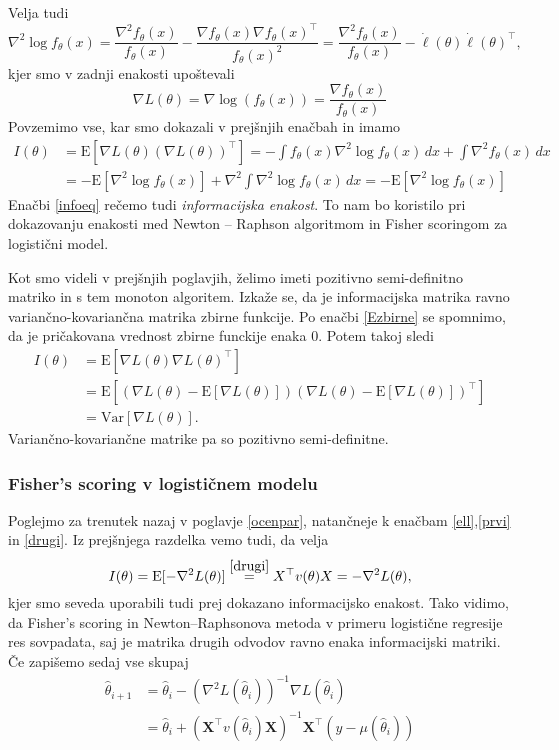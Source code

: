 \documentclass[12pt,a4paper]{amsart}
\theoremstyle{definition} %
\theoremstyle{plain} %
\begin{document}
Velja tudi
\[
    \nabla^{2} \log{f_{\theta}(x)} = \frac{\nabla^2 f_{\theta}(x)}{f_{\theta}(x)} - \frac{\nabla f_{\theta}(x) \nabla f_{\theta}(x)^\top }{f_{\theta}(x)^{2}} = 
    \frac{\nabla^2 f_{\theta}(x)}{f_{\theta}(x)} - \dot{\ell}(\theta)\dot{\ell}(\theta)^\top,
\]
kjer smo v zadnji enakosti upoštevali
\[
    \nabla L (\theta) = \nabla \log(f_{\theta}(x)) = \frac{\nabla f_{\theta}(x)}{f_{\theta}(x)} 
\]
Povzemimo vse, kar smo dokazali v prejšnjih enačbah in imamo
\begin{align}\label{infoeq}
    I(\theta) &= \mathrm{E}[\nabla L(\theta)(\nabla L(\theta))^\top] =  -\int f_{\theta}(x) \nabla^2 \log f_{\theta}(x) \,dx+ \int \nabla^2 f_{\theta}(x) \,dx \nonumber \\
    &= -\mathrm{E}[\nabla^2 \log f_{\theta}(x)] + \nabla^2\int \nabla^2 \log f_{\theta}(x) \,dx = -\mathrm{E}[\nabla^2 \log f_{\theta}(x)]
\end{align}
Enačbi \eqref{infoeq} rečemo tudi \textit{informacijska enakost}. To nam bo koristilo pri dokazovanju enakosti med Newton -- Raphson algoritmom in Fisher scoringom za logistični model.

Kot smo videli v prejšnjih poglavjih, želimo imeti pozitivno semi-definitno matriko in s tem monoton algoritem. Izkaže se, da je informacijska matrika ravno variančno-kovariančna matrika
zbirne funkcije. Po enačbi \eqref{Ezbirne} se spomnimo, da je pričakovana vrednost zbirne funckije enaka 0. Potem takoj sledi
\begin{align}
    I(\theta) &= \mathrm{E}[\nabla L(\theta)\nabla L(\theta)^\top] \nonumber\\
    &= \mathrm{E}[\left(\nabla L(\theta) - \mathrm{E}[\nabla L(\theta)]\right)\left(\nabla L(\theta) - \mathrm{E}[\nabla L(\theta)]\right)^\top] \nonumber \\
    &= \mathrm{Var}[\nabla L(\theta)].
\end{align}
Variančno-kovariančne matrike pa so pozitivno semi-definitne.

\subsubsection{Fisher's scoring v logističnem modelu}
Poglejmo za trenutek nazaj v poglavje \ref{ocenpar}, natančneje k enačbam \eqref{ell},\eqref{prvi} in \eqref{drugi}. Iz prejšnjega razdelka vemo tudi, da velja
\[
    I(\theta) = \mathrm{E}[-\nabla ^2 L(\theta)] \overset{\eqref{drugi}}{=} X^\top v(\theta)X = -\nabla ^2 L(\theta),
\]
kjer smo seveda uporabili tudi prej dokazano informacijsko enakost. Tako vidimo, da Fisher's scoring in Newton--Raphsonova metoda v primeru logistične regresije
res sovpadata, saj je matrika drugih odvodov ravno enaka informacijski matriki. Če zapišemo sedaj vse skupaj
\begin{align}
    \hat{\theta}_{i+1} &= \hat{\theta}_{i} - (\nabla^{2} L(\hat{\theta}_{i}))^{-1} \nabla L(\hat{\theta}_{i}) \nonumber \\
    &= \hat{\theta}_{i} + (\mathbf{X}^\top v(\hat{\theta}_{i}) \mathbf{X})^{-1}\mathbf{X}^\top(y - \mu(\hat{\theta}_{i})) 
\end{align}
\end{document}
